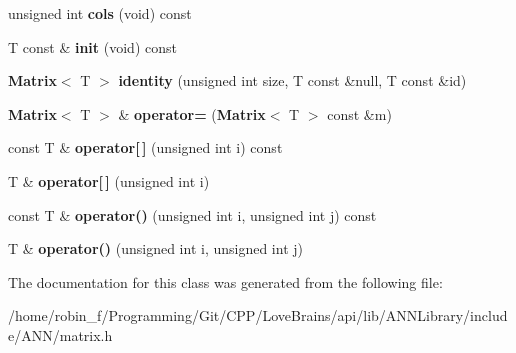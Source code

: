 \begin{DoxyCompactItemize}
\item 
unsigned int {\bfseries cols} (void) const \label{class_g_a_n_n_1_1_matrix_adc449f757249fe5bfc5bdae3c809d7e7}

\item 
T const \& {\bfseries init} (void) const \label{class_g_a_n_n_1_1_matrix_a5369d9c2dc7ae6a0941f1aba36f15259}

\item 
{\bf Matrix}$<$ T $>$ {\bfseries identity} (unsigned int size, T const \&null, T const \&id)\label{class_g_a_n_n_1_1_matrix_ae61ef07a101463ad49ab8f9f7dd4f2fe}

\item 
{\bf Matrix}$<$ T $>$ \& {\bfseries operator=} ({\bf Matrix}$<$ T $>$ const \&m)\label{class_g_a_n_n_1_1_matrix_a0aa93d1a66567637deb98c943f936fd4}

\item 
const T \& {\bfseries operator[$\,$]} (unsigned int i) const \label{class_g_a_n_n_1_1_matrix_add9f200cb6a2e53709090621e3a1150a}

\item 
T \& {\bfseries operator[$\,$]} (unsigned int i)\label{class_g_a_n_n_1_1_matrix_a700ad2c1e9ab4fd76fe1cb18092a80f1}

\item 
const T \& {\bfseries operator()} (unsigned int i, unsigned int j) const \label{class_g_a_n_n_1_1_matrix_aa3bef5292a718f45e094926602ff65ca}

\item 
T \& {\bfseries operator()} (unsigned int i, unsigned int j)\label{class_g_a_n_n_1_1_matrix_ac3f7f2d7467ba5bc95fca1890be74a38}

\end{DoxyCompactItemize}


The documentation for this class was generated from the following file\+:\begin{DoxyCompactItemize}
\item 
/home/robin\+\_\+f/\+Programming/\+Git/\+C\+P\+P/\+Love\+Brains/api/lib/\+A\+N\+N\+Library/include/\+A\+N\+N/matrix.\+h\end{DoxyCompactItemize}
